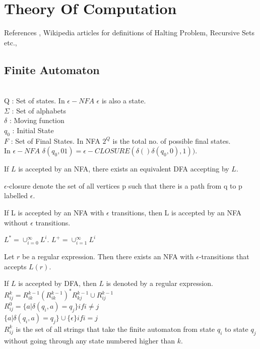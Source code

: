 \documentclass[a4paper,oneside]{book}
\begin{document}
\part{Theory Of Computation}
References \cite{ullman1979introduction}, Wikipedia articles for definitions of Halting Problem, Recursive Sets etc., \newpage
\chapter{Finite Automaton}
\begin{definition}
\\
Q : Set of states. In $\epsilon-NFA$ $\epsilon$ is also a state.\\
$\Sigma$ : Set of alphabets\\
$\delta$ : Moving function\\
$q_0$ : Initial State\\
$F$ : Set of Final States. In NFA $2^Q$ is the total no. of possible final states.\\
In $\epsilon-NFA$ $\delta(q_0, 01) = \epsilon-CLOSURE(\delta()\delta(q_0, 0), 1))$.
\end{definition}
\begin{theorem}
If $L$ is accepted by an NFA, there exists an equivalent DFA accepting by $L$.
\end{theorem}
\begin{definition}
$\epsilon$-closure denote the set of all vertices p such that there is a path from q to p labelled $\epsilon$.
\end{definition}
\begin{definition}
If L is accepted by an NFA with $\epsilon$ transitions, then L is accepted by an NFA without $\epsilon$ transitions.
\end{definition}
\begin{definition}
$L^* = \cup_{i=0}^{\infty} L^i$. $L^+ = \cup_{i=1}^{\infty} L^i$
\end{definition}
\begin{theorem}
Let $r$ be a regular expression. Then there exists an NFA with $\epsilon$-transitions that accepts $L(r)$.
\end{theorem}
\begin{definition}
If $L$ is accepted by DFA, then $L$ is denoted by a regular expression.\\
$R^{k}_{ij} = R^{k-1}_{ik}(R^{k-1}_{ik})^*R_{kj}^{k-1} \cup R_{ij}^{k-1}$\\
$R^{0}_{ij} = \{a| \delta(q_i, a) = q_j \}  if i \neq j$\\
$\{a | \delta(q_i, a) = q_j\} \cup \{\epsilon\}    if i = j$\\
$R^{k}_{ij}$ is the set of all strings that take the finite automaton from state $q_i$ to state $q_j$ without going through any state numbered higher than $k$.
\end{definition}
\end{document}
